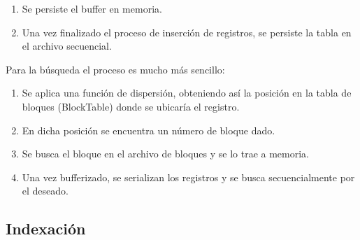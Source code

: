 \documentclass{article}
\begin{document}
{\begin{enumerate}
\begin{enumerate}
				\item Si TD != TT (el bloque está referenciado más de una sola vez):

					\begin{enumerate}
					\itemsep=5pt \topsep=0pt \partopsep=0pt \parskip=0pt \parsep=0pt

						\item Se crea un bloque 
						\item Se lo inserta en la posición donde estaba el bloque viejo y en las siguientes TD posiciones a su derecha y TD posiciones a su izquierda.
						\item Se redispersan los registros.
						\item Se agrega el registro en el bloque correspondiente.

					\end{enumerate}
			\end{enumerate}

		\item Se persiste el buffer en memoria.

		\item Una vez finalizado el proceso de inserción de registros, se persiste la tabla en el archivo secuencial.

	\end{enumerate}}
	\bigskip\bigskip

	Para la búsqueda el proceso es mucho más sencillo:
	\bigskip

	{\ttfamily\footnotesize
	\begin{enumerate}
	\itemsep=5pt \topsep=0pt \partopsep=0pt \parskip=0pt \parsep=0pt

		\item Se aplica una función de dispersión, obteniendo así la posición en la tabla de bloques (BlockTable) donde se ubicaría el registro.

		\item En dicha posición se encuentra un número de bloque dado.

		\item Se busca el bloque en el archivo de bloques y se lo trae a memoria.

		\item Una vez bufferizado, se serializan los registros y se busca secuencialmente por el deseado.

	\end{enumerate}}
\bigskip\medskip




\subsection{Indexación}
\medskip
\end{document}
